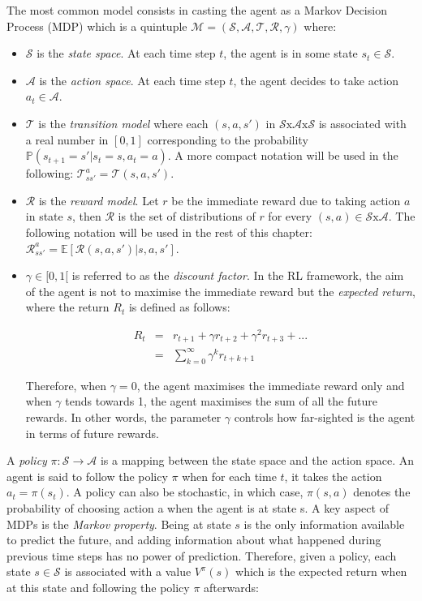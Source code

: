 			The most common model consists in casting the agent as a Markov Decision Process (MDP) which is a quintuple $\mathcal{M} = (\mathcal{S},\mathcal{A},\mathscr{T},\mathscr{R},\gamma)$ where:
			\begin{itemize}
					\item $\mathcal{S}$ is the \textit{state space}. At each time step $t$, the agent is in some state $s_t \in \mathcal{S}$.
					\item $\mathcal{A}$ is the \textit{action space}. At each time step $t$, the agent decides to take action $a_t \in \mathcal{A}$.
					\item $\mathscr{T}$ is the \textit{transition model} where each $(s,a,s')$ in $\mathcal{S} \text{x} \mathcal{A} \text{x} \mathcal{S}$ is associated with a real number in $[0,1]$ corresponding to the probability $\mathbb{P} (s_{t+1} = s'|s_t = s, a_t=a)$. A more compact notation will be used in the following: $\mathscr{T}_{ss'}^a = \mathscr{T} (s,a,s')$.
					\item $\mathscr{R}$ is the \textit{reward model}. Let $r$ be the immediate reward due to taking action $a$ in state $s$, then $\mathscr{R}$ is the set of distributions of $r$ for every $(s,a) \in \mathcal{S} \text{x} \mathcal{A}$. The following notation will be used in the rest of this chapter: $\mathscr{R}_{ss'}^a = \mathbb{E} [\mathscr{R} (s,a,s')|s,a,s']$.
					\item $\gamma \in [0,1[$ is referred to as the \textit{discount factor}. In the RL framework, the aim of the agent is not to maximise the immediate reward but the \textit{expected return}, where the return $R_t$ is defined as follows:
					
					\begin{eqnarray}
						R_t & = & r_{t+1} + \gamma r_{t+2} + \gamma^2 r_{t+3} + ... \nonumber \\
						& = & \sum_{k=0}^\infty \gamma^k r_{t+k+1} \label{eq:return}
					\end{eqnarray}
					
					Therefore, when $\gamma = 0$, the agent maximises the immediate reward only and when $\gamma$ tends towards 1, the agent maximises the sum of all the future rewards. In other words, the parameter $\gamma$ controls how far-sighted is the agent in terms of future rewards.
	\end{itemize}
			
			A \textit{policy} $\pi : \mathcal{S} \rightarrow \mathcal{A}$ is a mapping between the state space and the action space. An agent is said to follow the policy $\pi$ when for each time $t$, it takes the action $a_t = \pi(s_t)$. A policy can also be stochastic, in which case, $\pi (s,a)$ denotes the probability of choosing action a when the agent is at state s. A key aspect of MDPs is the \textit{Markov property}. Being at state $s$ is the only information available to predict the future, and adding information about what happened during previous time steps has no power of prediction. Therefore, given a policy, each state $s \in \mathcal{S}$ is associated with a value $V^\pi (s)$ which is the expected return when at this state and following the policy $\pi$ afterwards:
				
